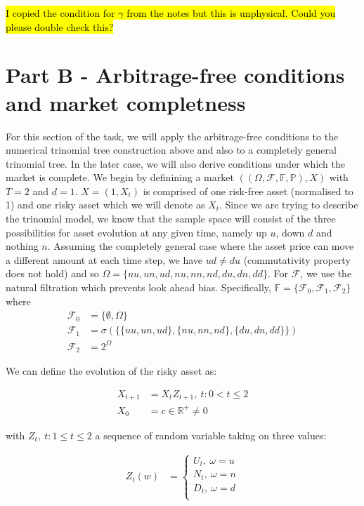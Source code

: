 \documentclass{article}
\begin{document}
\hl{I copied the condition for $\gamma$ from the notes but this is unphysical. Could you please double check this? }

\section{Part B - Arbitrage-free conditions and market completness}
For this section of the task, we will apply the arbitrage-free conditions to the numerical trinomial tree construction above and also to a completely general trinomial tree. In the later case, we will also derive conditions under which the market is complete. We begin by definining a market $((\Omega, \mathcal{F},\mathbb{F},\mathbb{P}),X)$ with $T=2$ and $d=1$. $X = (1,X_t)$ is comprised of one risk-free asset (normalised to 1) and one risky asset which we will denote as $X_t$. Since we are trying to describe the trinomial model, we know that the sample space will consist of the three possibilities for asset evolution at any given time, namely up $u$, down $d$ and nothing $n$. Assuming the completely general case where the asset price can move a different amount at each time step, we have $ud\neq du$ (commutativity property does not hold) and so $\Omega = \{uu,un,ud,nu,nn,nd,du,dn,dd\}$. For $\mathcal{F}$, we use the natural filtration which prevents look ahead bias. Specifically, $\mathbb{F} = \{\mathcal{F}_0, \mathcal{F}_1, \mathcal{F}_2\}$ where 
\begin{align*}
    \mathcal{F}_0 &= \{\emptyset,\Omega\} \\
    \mathcal{F}_1 &= \sigma(\{\{uu,un,ud\},\{nu,nn,nd\},\{du,dn,dd\}\}) \\
    \mathcal{F}_2 &= 2^\Omega
\end{align*}

We can define the evolution of the risky asset as:

\begin{align*}
    X_{t+1} &= X_tZ_{t+1},\medspace t:0< t\le 2\\
    X_0 & = c\in\mathbb{R}^+\neq0
\end{align*}

with $Z_t,\medspace t:1\le t\le 2$ a sequence of random variable taking on three values: 

\begin{align*}
Z_t(w) &= \begin{cases}
    U_t, \medspace \omega=u \\
    N_t, \medspace \omega=n \\
    D_t, \medspace \omega=d \\
\end{cases}
\end{align*}
\end{document}

